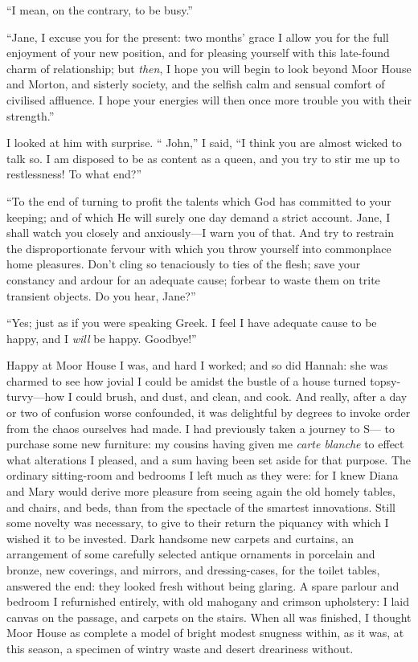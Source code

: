 \enquote{I mean, on the contrary, to be busy.}

\enquote{Jane, I excuse you for the present: two months' grace I allow you for
	the full enjoyment of your new position, and for pleasing yourself with
	this late-found charm of relationship; but \emph{then}, I hope you will
	begin to look beyond Moor House and Morton, and sisterly society, and
	the selfish calm and sensual comfort of civilised affluence. I hope
	your energies will then once more trouble you with their strength.}

I looked at him with surprise. \enquote{\St{} John,} I said, \enquote{I
	think you are almost wicked to talk so. I am disposed to be as content
	as a queen, and you try to stir me up to restlessness! To what end?}

\enquote{To the end of turning to profit the talents which God has
	committed to your keeping; and of which He will surely one day demand a
	strict account. Jane, I shall watch you closely and anxiously---I warn
	you of that. And try to restrain the disproportionate fervour with
	which you throw yourself into commonplace home pleasures. Don't cling
	so tenaciously to ties of the flesh; save your constancy and ardour for
	an adequate cause; forbear to waste them on trite transient objects. Do
	you hear, Jane?}

\enquote{Yes; just as if you were speaking Greek. I feel I have adequate cause
	to be happy, and I \emph{will} be happy. Goodbye!}

Happy at Moor House I was, and hard I worked; and so did Hannah: she was
charmed to see how jovial I could be amidst the bustle of a house turned
topsy-turvy---how I could brush, and dust, and clean, and cook. And
really, after a day or two of confusion worse confounded, it was
delightful by degrees to invoke order from the chaos ourselves had
made. I had previously taken a journey to S--- to purchase some new
furniture: my cousins having given me \emph{carte blanche} to effect
what alterations I pleased, and a sum having been set aside for that
purpose. The ordinary sitting-room and bedrooms I left much as they
were: for I knew Diana and Mary would derive more pleasure from seeing
again the old homely tables, and chairs, and beds, than from the
spectacle of the smartest innovations. Still some novelty was
necessary, to give to their return the piquancy with which I wished it
to be invested. Dark handsome new carpets and curtains, an arrangement
of some carefully selected antique ornaments in porcelain and bronze,
new coverings, and mirrors, and dressing-cases, for the toilet tables,
answered the end: they looked fresh without being glaring. A spare
parlour and bedroom I refurnished entirely, with old mahogany and
crimson upholstery: I laid canvas on the passage, and carpets on the
stairs. When all was finished, I thought Moor House as complete a model
of bright modest snugness within, as it was, at this season, a specimen
of wintry waste and desert dreariness without.

